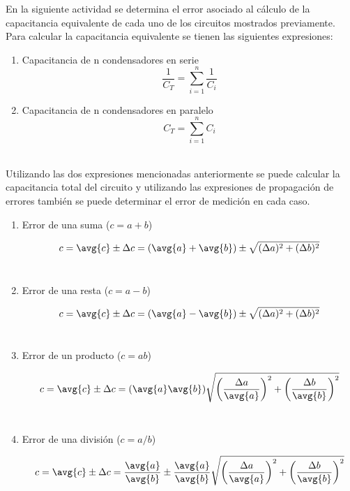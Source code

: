 \documentclass[letterpaper,11pt]{article} %
\begin{document}
En la siguiente actividad se determina el error asociado al cálculo de la capacitancia equivalente de cada uno de los circuitos mostrados previamente. Para calcular la capacitancia equivalente se tienen las siguientes expresiones:\\
\begin{enumerate}
    \item Capacitancia de n condensadores en serie \\
$$ \frac{1}{C_T} = \sum_{i=1}^{n} \frac{1}{C_i} $$
    \item Capacitancia de n condensadores en paralelo \\
$$ C_{T} = \sum_{i=1}^{n} C_i $$ 
\end{enumerate}
\\
Utilizando las dos expresiones mencionadas anteriormente se puede calcular la capacitancia total del circuito y utilizando las expresiones de propagación de errores también se puede determinar el error de medición en cada caso.\\

\begin{enumerate}
    \item Error de una suma ($c = a + b$)
    
    $$ c = \avg{c} \pm \Delta c = (\avg{a} + \avg{b}) \pm \sqrt{ (\Delta a)^2 + (\Delta b)^2 }$$ \\
    
    \item Error de una resta ($c = a - b$)
    
    $$c = \avg{c} \pm \Delta c = (\avg{a} - \avg{b}) \pm \sqrt{(\Delta a)^2 + (\Delta b)^2 }$$\\

    \item Error de un producto ($c = ab$)

    $$c = \avg{c} \pm \Delta c = (\avg{a} \avg{b}) \sqrt{ \left(\frac{\Delta a}{\avg{a}}\right)^2 + \left(\frac{\Delta b}{\avg{b}}\right)^2 }  $$ \\

    \item Error de una división ($c = a/b$)

    $$c = \avg{c} \pm \Delta c = \frac{\avg{a}}{\avg{b}} \pm \frac{\avg{a}}{\avg{b}} \sqrt{ \left(\frac{\Delta a}{\avg{a}}\right)^2 + \left( \frac{\Delta b}{\avg{b}} \right) ^2 } $$

\end{enumerate}
\end{document}
